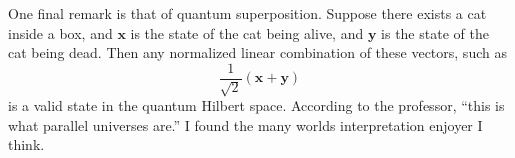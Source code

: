\documentclass[11pt, letterpaper]{report}
\begin{document}
One final remark is that of quantum superposition. Suppose there exists a cat inside a box, and $\mathbf{x}$ is the state of the cat being alive, and $\mathbf{y}$ is the state of the cat being dead. Then any normalized linear combination of these vectors, such as
\[
	\frac{1}{\sqrt{2} }\left( \mathbf{x}+\mathbf{y} \right) 
\]
is a valid state in the quantum Hilbert space. According to the professor, ``this is what parallel universes are.'' I found the many worlds interpretation enjoyer I think.
\end{document}
